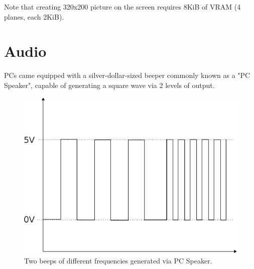 \documentclass[book.tex]{subfiles}
\begin{document}
\par
Note that creating 320x200 picture on the screen requires 8KiB of VRAM (4 planes, each 2KiB). 

















\section{Audio}
\label{hardware-audio}
PCs came equipped with a silver-dollar-sized beeper commonly known as a "PC Speaker", capable of generating a square wave via 2 levels of output.\\
\begin{figure}[H]

\centering

\end{figure}


\begin{figure}[H]

\centering
\includegraphics[width=.8\textwidth]{imgs/drawings/square_wave.eps}
\caption{Two beeps of different frequencies generated via PC Speaker.}
\end{figure}
\end{document}
